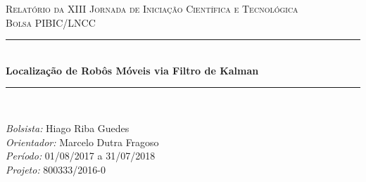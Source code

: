 \documentclass[11pt]{article}
\begin{document}

\begin{titlepage} %
	\newcommand{\HRule}{\rule{\linewidth}{0.5mm}} %
	
	\center %
	
	
	\textsc{\LARGE Relatório da XIII Jornada
de Iniciação Científica e Tecnológica}\\[1.5cm] %
	
	\textsc{\Large Bolsa PIBIC/LNCC}\\[0.5cm] %
	
	
	
	\HRule\\[0.4cm]
	
	{\huge\bfseries  Localização de Robôs Móveis via Filtro de Kalman}\\[0.4cm] %
	
	\HRule\\[1.5cm]
	
	\begin{flushleft}
	

			\large
			\textit{Bolsista: } 
			Hiago Riba Guedes %
						\large \\
			\textit{Orientador: }
			Marcelo Dutra Fragoso %
			\\ \textit{Período: } 01/08/2017 a 31/07/2018  	\\

			\textit{Projeto: } 800333/2016-0

		\end{flushleft}
	

\end{titlepage}
\end{document}
